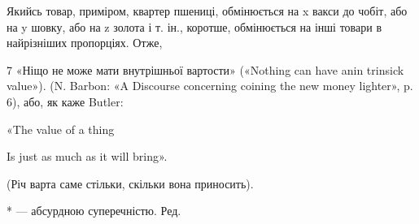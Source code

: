Якийсь товар, приміром, квартер пшениці, обмінюється на x
вакси до чобіт, або на y шовку, або на z золота і т. ін., коротше,
обмінюється на інші товари в найрізніших пропорціях. Отже,

7 «Ніщо не може мати внутрішньої вартости» («Nothing can have
anin trinsick value»). (N. Barbon: «A Discourse concerning coining the new
money lighter», p. 6), або, як каже Butler:

«The value of a thing

Is just as much as it will bring».

(Річ варта саме стільки, скільки вона приносить).

* — абсурдною суперечністю. Ред.
\parbreak{}  %
